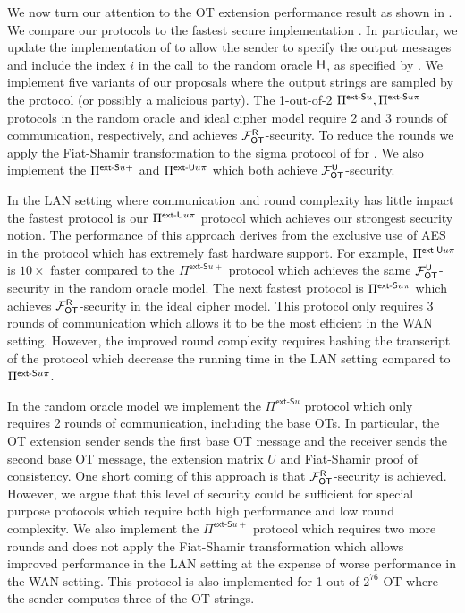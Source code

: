 We now turn our attention to the  OT extension performance result as shown in . We compare our protocols to the fastest secure implementation \cite{C:KelOrsSch15,libOTe}. In particular, we update the \cite{libOTe} implementation of \cite{C:KelOrsSch15} to allow the sender to specify the output messages and include the index $i$ in the call to the random oracle $\mathsf{H}$, as specified by \cite{C:KelOrsSch15}. We implement five variants of our proposals where the output strings are sampled by the protocol (or possibly a malicious party). The 1-out-of-2 $\Pi^{\textsf{ext-\ensuremath{\mathsf{S}}}u},\Pi^{\textsf{ext-\ensuremath{\mathsf{S}}}u\pi}$ protocols in the random oracle and ideal cipher model require 2 and 3 rounds of communication, respectively, and achieves $\mathcal{F}_{\mathsf{OT}}^\mathsf{R}$-security. To reduce the rounds we apply the Fiat-Shamir transformation \cite{C:FiaSha86} to the sigma protocol of \cite{C:KelOrsSch15} for . We also implement the $\Pi^{\textsf{ext-\ensuremath{\mathsf{S}}} u+}$ and $\Pi^{\textsf{ext-\ensuremath{\mathsf{U}}} u\pi}$ which both achieve $\mathcal{F}_{\mathsf{OT}}^\mathsf{U}$-security. 

In the LAN setting where communication and round complexity has little impact the fastest protocol is our $\Pi^{\textsf{ext-\ensuremath{\mathsf{U}}} u\pi}$ protocol which achieves our strongest security notion. The performance of this approach derives from the exclusive use of AES in the protocol which has extremely fast hardware support. For example, $\Pi^{\textsf{ext-\ensuremath{\mathsf{U}}} u\pi}$ is $10\times$ faster compared to the $\Pi^{\textsf{ext-S}u+}$ protocol which achieves the same $\mathcal{F}_{\mathsf{OT}}^\mathsf{U}$-security in the random oracle model. The next fastest protocol is $\Pi^{\textsf{ext-\ensuremath{\mathsf{S}}}u\pi}$ which achieves $\mathcal{F}_{\mathsf{OT}}^\mathsf{R}$-security in the ideal cipher model. This protocol only requires 3 rounds of communication which allows it to be the most efficient in the WAN setting. However, the improved round complexity requires hashing the transcript of the protocol which decrease the running time in the LAN setting compared to $\Pi^{\textsf{ext-\ensuremath{\mathsf{S}}}u\pi}$.

In the random oracle model we implement the $\Pi^{\textsf{ext-S}u}$ protocol which only requires 2 rounds of communication, including the base OTs. In particular, the OT extension sender sends the first base OT message and the receiver sends the second base OT message, the extension matrix $U$ and Fiat-Shamir proof of consistency. One short coming of this approach is that $\mathcal{F}_{\mathsf{OT}}^\mathsf{R}$-security is achieved. However, we argue that this level of security could be sufficient for special purpose protocols which require both high performance and low round complexity. We also implement the $\Pi^{\textsf{ext-S}u+}$ protocol which requires two more rounds and does not apply the Fiat-Shamir transformation which allows improved performance in the LAN setting at the expense of worse performance in the WAN setting.  This protocol is also implemented for 1-out-of-$2^{76}$ OT where the sender computes three of the OT strings. 

